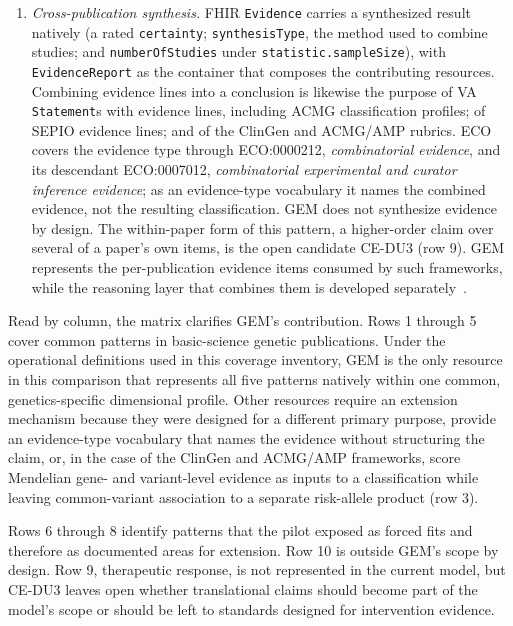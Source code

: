 \begin{enumerate}
  \item \emph{Cross-publication synthesis.} FHIR \texttt{Evidence} carries
    a synthesized result natively (a rated \texttt{certainty};
    \texttt{synthesisType}, the method used to combine studies; and
    \texttt{numberOfStudies} under \texttt{statistic.sampleSize}), with
    \texttt{EvidenceReport} as the
    container that composes the contributing resources. Combining evidence
    lines into a conclusion is likewise the purpose of VA
    \texttt{Statement}s with evidence lines, including ACMG classification
    profiles; of SEPIO evidence lines; and of the ClinGen and ACMG/AMP
    rubrics. ECO covers the evidence type through ECO:0000212,
    \emph{combinatorial evidence}, and its descendant ECO:0007012,
    \emph{combinatorial experimental and curator inference evidence}; as
    an evidence-type vocabulary it names the combined evidence, not the
    resulting classification. GEM does not synthesize evidence by design.
    The within-paper form of this pattern, a higher-order claim over several
    of a paper's own items, is the open candidate CE-DU3 (row 9). GEM
    represents the per-publication evidence items
    consumed by such frameworks, while the reasoning layer that combines
    them is developed separately~\cite{our_preprint}.
\end{enumerate}

Read by column, the matrix clarifies GEM's contribution. Rows 1 through 5
cover common patterns in basic-science genetic publications. Under the
operational definitions used in this coverage inventory, GEM is the only
resource in this comparison that represents all five patterns natively
within one common, genetics-specific dimensional profile. Other resources
require an extension mechanism because they were designed for a different
primary purpose, provide an evidence-type vocabulary that names the evidence
without structuring the claim, or, in the case of the ClinGen and ACMG/AMP
frameworks, score Mendelian gene- and variant-level evidence as inputs to a
classification while leaving common-variant association to a separate
risk-allele product (row 3).

Rows 6 through 8 identify patterns that the pilot exposed as forced fits and
therefore as documented areas for extension. Row 10 is outside GEM's scope
by design. Row 9, therapeutic response, is not represented in the current
model, but CE-DU3 leaves open whether translational claims should become part
of the model's scope or should be left to standards designed for
intervention evidence.

